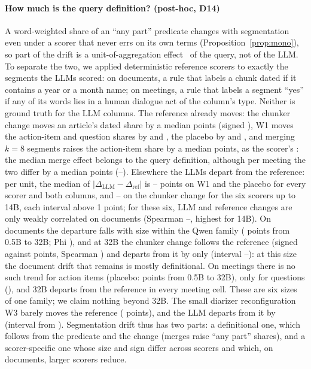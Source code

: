 \documentclass[conference]{IEEEtran}
\begin{document}
\paragraph*{How much is the query definition? (post-hoc, D14)} A word-weighted share of an ``any part'' predicate
changes with segmentation even under a scorer that never errs on its own terms (Proposition~\ref{prop:mono}), so part
of the drift is a unit-of-aggregation effect~\cite{maup} of the query, not of the LLM. To separate the two, we applied
deterministic reference scorers to exactly the segments the LLMs scored: on documents, a rule that labels a chunk
dated if it contains a year or a month name; on meetings, a rule that labels a segment ``yes'' if any of its words
lies in a human dialogue act of the column's type. Neither is ground truth for the LLM columns. The reference already
moves: the chunker change moves an article's dated share by a median \nOrWfourRefAbs{} points (signed
\nOrWfourRefSgn), W1 moves the action-item and question shares by \nOrWoneRefAc{} and \nOrWoneRefQu, the placebo by
\nOrWtwoRefAc{} and \nOrWtwoRefQu, and merging $k=8$ segments raises the action-item share by a median \nOrKeightRef{}
points, as the scorer's \nOrKeightLlm: the median merge effect belongs to the query definition, although per meeting the
two differ by a median \nOrKeightEx{} points (\nOrKeightExLo--\nOrKeightExHi). Elsewhere the LLMs depart
from the reference: per unit, the median of $|\Delta_{\mathrm{LLM}}-\Delta_{\mathrm{ref}}|$ is
\nOrAmiExMin--\nOrAmiExMax{} points on W1 and the placebo for every scorer and both columns, and
\nOrWfourExMinSix--\nOrWfourExMax{} on the chunker change for the six scorers up to 14B, each interval above 1 point;
for these six, LLM and reference changes are only weakly correlated on documents (Spearman
\nOrWfourRhoMin--\nOrWfourRhoMaxSix, highest for 14B). On documents the departure falls with size within the Qwen
family (\nOrWfourExQwenSeq{} points from 0.5B to 32B; Phi \nOrWfourExPhi), and at 32B the chunker change follows the
reference (signed \nOrWfourSgnLlmThirtytwo{} against \nOrWfourSgnRefThirtytwo{} points, Spearman
\nOrWfourRhoThirtytwo) and departs from it by only \nOrWfourExThirtytwo{} (interval
\nOrWfourExThirtytwoLo--\nOrWfourExThirtytwoHi): at this size the document drift that remains is mostly definitional. On
meetings there is no such trend for action items (placebo: \nOrWtwoAcExQwenSeq{} points from 0.5B to 32B), only for
questions (\nOrWtwoQuExQwenSeq), and 32B departs from the reference in every meeting cell. These are six sizes of one
family; we claim nothing beyond 32B. The small diarizer
reconfiguration W3 barely moves the reference (\nOrWthreeRef{} points), and the LLM departs from it by
\nOrWthreeEx{} (interval from \nOrWthreeExLo). Segmentation drift thus has two parts: a definitional one, which
follows from the predicate and the change (merges raise ``any part'' shares), and a scorer-specific one whose size
and sign differ across scorers and which, on documents, larger scorers reduce.
\end{document}
